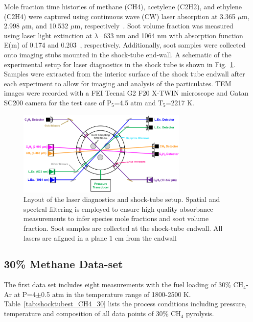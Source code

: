 Mole fraction time histories of methane (CH4), acetylene (C2H2), and ethylene (C2H4) were captured using continuous wave (CW) laser absorption at 3.365 $\mu$m, 2.998 $\mu$m, and 10.532 $\mu$m, respectively~\citep{pinkowski2019multi, cassady2020thermal, stranic2014laser}. Soot volume fraction was measured using laser light extinction at $\lambda$=633 nm and 1064 nm with absorption function E(m) of 0.174 and 0.203~\citep{lee1981optical}, respectively. Additionally, soot samples were collected onto imaging stubs mounted in the shock-tube end-wall. A schematic of the experimental setup for laser diagnostics in the shock tube is shown in Fig.~\ref{fig:shocktubelaserlayout}. Samples were extracted from the interior surface of the shock tube endwall after each experiment to allow for imaging and analysis of the particulates. TEM images were recorded with a FEI Tecnai G2 F20 X-TWIN microscope and Gatan SC200 camera for the test case of $\mathrm{P_5}$=4.5 atm and $\mathrm{T_5}$=2217 K.

\begin{figure}[H]
	\centering
	\includegraphics[width=0.75\textwidth]{Figures/Results/Shocktube/laserdiagnostics.pdf}
	\caption{Layout of the laser diagnostics and shock-tube setup. Spatial and spectral filtering is employed to ensure high-quality absorbance measurements to infer species mole fractions and soot volume fraction. Soot samples are collected at the shock-tube endwall. All lasers are aligned in a plane 1 cm from the endwall}
	\label{fig:shocktubelaserlayout} 
\end{figure}

\subsection{30\% Methane Data-set}

The first data set includes eight measurements with the fuel loading of 30\% $\mathrm{CH_4}$-Ar at P=4$\pm$0.5 atm in the temperature range of 1800-2500 K. Table~\ref{tab:shocktubest_CH4_30} lists the process conditions including pressure, temperature and composition of all data points of 30\% $\mathrm{CH_4}$ pyrolysis.


